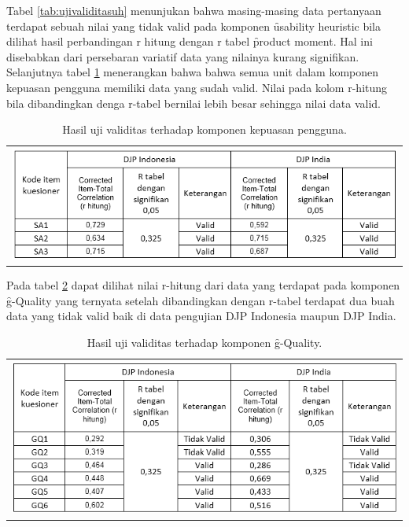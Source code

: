 Tabel \ref{tab:ujivaliditasuh} menunjukan bahwa masing-masing data pertanyaan terdapat sebuah nilai yang tidak valid pada komponen \f{usability heuristic} bila dilihat hasil perbandingan r hitung dengan r tabel \f{product moment}. Hal ini disebabkan dari persebaran variatif data yang nilainya kurang signifikan.
\newline\\
Selanjutnya tabel \ref{tab:ujivaliditassat} menerangkan bahwa bahwa semua unit dalam komponen kepuasan pengguna memiliki data yang sudah valid. Nilai pada kolom r-hitung bila dibandingkan denga r-tabel bernilai lebih besar sehingga nilai data valid.
\begin{table}
	\centering
	\caption{Hasil uji validitas terhadap komponen kepuasan pengguna.}
	\label{tab:ujivaliditassat}
	\begin{tabular}{c}
		\includegraphics[width=\textwidth]
		{pics/validitasKepuasanPengguna.PNG}
	\end{tabular}
\end{table}
\noindent
Pada tabel \ref{tab:ujivaliditasgq} dapat dilihat nilai r-hitung dari data yang terdapat pada komponen \f{g-Quality} yang ternyata setelah dibandingkan dengan r-tabel terdapat dua buah data yang tidak valid baik di data pengujian DJP Indonesia maupun DJP India.
\begin{table}
	\centering
	\caption{Hasil uji validitas terhadap komponen \f{g-Quality}.}
	\label{tab:ujivaliditasgq}
	\begin{tabular}{c}
		\includegraphics[width=\textwidth]
		{pics/validitasGQuality.PNG}
	\end{tabular}
\end{table}
